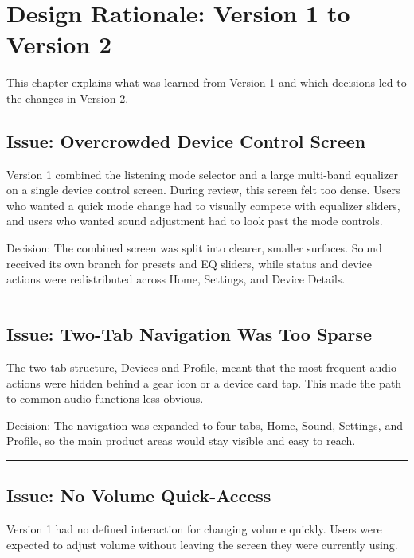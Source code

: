 \documentclass[12pt, a4paper]{report}
\newenvironment{highlight}{%
  \par\vspace{6pt}%
  \noindent%
  \begin{lrbox}{\hlbox}%
    \begin{minipage}{\dimexpr\linewidth-14pt\relax}%
      \vspace{6pt}\small%
}{%
      \vspace{6pt}%
    \end{minipage}%
  \end{lrbox}%
  \noindent\colorbox{lightgray}{%
    \hspace{2pt}%
    \textcolor{accentblue}{\rule[-0.2\baselineskip]{2pt}{\dimexpr\ht\hlbox+\dp\hlbox\relax}}%
    \hspace{8pt}\usebox{\hlbox}\hspace{2pt}%
  }%
  \par\vspace{6pt}%
}
\begin{document}
\chapter{Design Rationale: Version 1 to Version 2}

This chapter explains what was learned from Version 1 and which decisions
led to the changes in Version 2.

\section{Issue: Overcrowded Device Control Screen}

Version 1 combined the listening mode selector and a large multi-band equalizer on
a single device control screen. During review, this screen felt too dense. Users
who wanted a quick mode change had to visually compete with equalizer sliders, and
users who wanted sound adjustment had to look past the mode controls.

\begin{highlight}
Decision: The combined screen was split into clearer, smaller surfaces. Sound
received its own branch for presets and EQ sliders, while status and device actions
were redistributed across Home, Settings, and Device Details.
\end{highlight}

\section{Issue: Two-Tab Navigation Was Too Sparse}

The two-tab structure, Devices and Profile, meant that the most frequent audio
actions were hidden behind a gear icon or a device card tap. This made the path to
common audio functions less obvious.

\begin{highlight}
Decision: The navigation was expanded to four tabs, Home, Sound, Settings, and
Profile, so the main product areas would stay visible and easy to reach.
\end{highlight}

\section{Issue: No Volume Quick-Access}

Version 1 had no defined interaction for changing volume quickly. Users were expected
to adjust volume without leaving the screen they were currently using.
\end{document}
